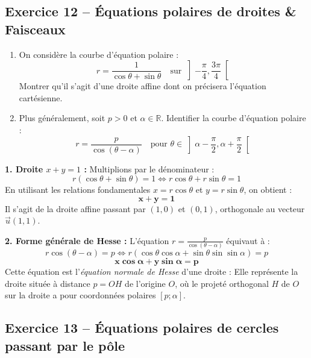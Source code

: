 \documentclass[11pt,a4paper]{article}
\newcommand{\R}{\mathbb{R}}
\begin{document}
\vspace{0.3cm}

\subsection*{Exercice 12 -- Équations polaires de droites \& Faisceaux}

\begin{enumerate}[label=\arabic*.]
    \item On considère la courbe d'équation polaire :
    \[
    r = \frac{1}{\cos\theta + \sin\theta} \quad \text{sur } \left]-\frac{\pi}{4}, \frac{3\pi}{4}\right[
    \]
    Montrer qu'il s'agit d'une droite affine dont on précisera l'équation cartésienne.
    \item Plus généralement, soit $p > 0$ et $\alpha \in \R$. Identifier la courbe d'équation polaire :
    \[
    r = \frac{p}{\cos(\theta - \alpha)} \quad \text{pour } \theta \in \left]\alpha - \frac{\pi}{2}, \alpha + \frac{\pi}{2}\right[
    \]
\end{enumerate}

\begin{correctionbox}
\textbf{1. Droite $x + y = 1$ :}
Multiplions par le dénominateur :
\[
r(\cos\theta + \sin\theta) = 1 \iff r\cos\theta + r\sin\theta = 1
\]
En utilisant les relations fondamentales $x = r\cos\theta$ et $y = r\sin\theta$, on obtient :
\[
\mathbf{x + y = 1}
\]
Il s'agit de la droite affine passant par $(1, 0)$ et $(0, 1)$, orthogonale au vecteur $\vec{u}(1, 1)$.

\textbf{2. Forme générale de Hesse :}
L'équation $r = \frac{p}{\cos(\theta - \alpha)}$ équivaut à :
\[
r \cos(\theta - \alpha) = p \iff r (\cos\theta \cos\alpha + \sin\theta \sin\sin\alpha) = p
\]
\[
\mathbf{x \cos\alpha + y \sin\alpha = p}
\]
Cette équation est l'\emph{équation normale de Hesse} d'une droite :
Elle représente la droite située à distance $p = OH$ de l'origine $O$, où le projeté orthogonal $H$ de $O$ sur la droite a pour coordonnées polaires $[p; \alpha]$.
\end{correctionbox}

\vspace{0.3cm}

\subsection*{Exercice 13 -- Équations polaires de cercles passant par le pôle}
\end{document}
